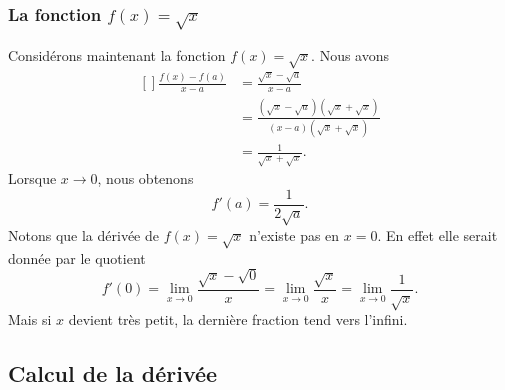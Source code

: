 \subsubsection{La fonction $f(x)=\sqrt{x}$}

Considérons maintenant la fonction $f(x)=\sqrt{x}$. Nous avons
\begin{equation}
	\begin{aligned}[]
		\frac{ f(x)-f(a) }{ x-a }&=\frac{ \sqrt{x}-\sqrt{a} }{ x-a }\\
		&=\frac{ (\sqrt{x}-\sqrt{a})(\sqrt{x}+\sqrt{x}) }{ (x-a)(\sqrt{x}+\sqrt{x}) }\\
		&=\frac{1}{ \sqrt{x}+\sqrt{x} }.
	\end{aligned}
\end{equation}
Lorsque $x\to 0$, nous obtenons
\begin{equation}
	f'(a)=\frac{1}{ 2\sqrt{a} }.
\end{equation}
Notons que la dérivée de $f(x)=\sqrt{x}$ n'existe pas en $x=0$. En effet elle serait donnée par le quotient
\begin{equation}
	f'(0)=\lim_{x\to 0} \frac{ \sqrt{x}-\sqrt{0} }{ x }=\lim_{x\to 0} \frac{ \sqrt{x} }{ x }=\lim_{x\to 0} \frac{1}{ \sqrt{x} }.
\end{equation}
Mais si $x$ devient très petit, la dernière fraction tend vers l'infini.

\subsection{Calcul de la dérivée}

